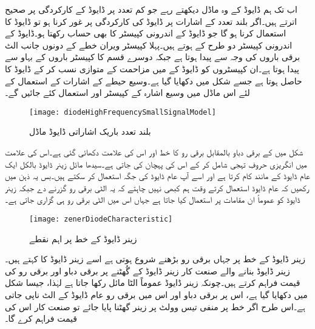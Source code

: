 	اب تک ہم ڈایوڈ کے وہ ماڈل دیکھتے رہے جو کم تعدد پر ڈایوڈ کے کارکردگی پر صحیح اترتے ہیں۔اگر بلند تعدد کے اشارات پر ڈایوڈ کی کارکردگی پر غور کرنا ہو تو ڈایوڈ کا  استعمال کرنا ہو گا جو ڈایوڈ کے اندرونی کپیسٹر کا بھی حساب رکھتا ہو۔ڈایوڈ کے اندرونی کپیسٹر دو طرح کے ہوتے ہیں۔پہلا کپیسٹر  ویران خطے کے دونوں جانب الٹ برقی باروں کی وجہ سے پیدا ہوتا ہے جبکہ دوسرے قسم کا کپیسٹر   باروں کے بہاو سے پیدا ہوتا ہے۔ان کپیسٹروں کو ڈایوڈ کے  میں مزاحمت  کے متوازی نسب کر کے ڈایوڈ کا 
  حاصل ہوتا ہے جسے شکل  میں دکھایا گیا ہے۔وسیع حیطے کے اشارات کے استعمال کے لئے اس ماڈل میں وسیع اشارہ کے کپیسٹر  اور   استعمال کئے جائیں گے۔
\begin{figure}
\centering
\texttt{[image: diodeHighFrequencySmallSignalModel]}
\caption{بلند تعدد باریک اشاراتی ڈایوڈ ماڈل}
\label{شکل_بلند_تعدد_ڈایوڈ_باریک_اشاراتی_ماڈل}
\end{figure}
شکل   میں  کے برقی دباو بالمقابل برقی رو  کا خط اور اس کی علامت دکھائی گئی ہے۔اس کی علامت میں انگریزی حروفِ تہجی   شامل کر کے اس کی پہچان کی جاتی ہے۔سیدھا مائل زینر ڈایوڈ بالکل ایک عام ڈایوڈ کے مانند کام کرتا ہے اور اسے آپ عام ڈایوڈ کی جگہ استعمال کر سکتے ہیں۔بس یہ ذہن میں رکھیں کہ عام ڈایوڈ استعمال کرتے وقت ہم کبھی نہیں چاہتے کہ یہ الٹی برقی رو گزرنے دے جبکہ زینر ڈایوڈ کو عموماً ان مقامات پر استعمال کیا جاتا ہے جہاں اس میں الٹی برقی رو ہی گزاری جاتی ہے۔
\begin{figure}
\centering
\texttt{[image: zenerDiodeCharacteristic]}
\caption{زینر ڈایوڈ کے خط پر اہم نقطے}
\label{شکل_زینر_ڈایوڈ_کا_خط}
\end{figure}
زینر ڈایوڈ کے خط پر جہاں برقی رو بڑھنے شروع ہوتی ہے اسے زینر ڈایوڈ کا    کہتے ہیں۔ زینر ڈایوڈ  بنانے والے صنعت کار زینر ڈایوڈ کے گُھٹنے پر برقی دباو  اور برقی رو  کی قیمت فراہم کرتے ہیں۔چونکہ زینر ڈایوڈ عموماً الٹا مائل رکھا جاتا ہے لہٰذا، جیسا شکل   میں دکھایا گیا ہے، اس پر برقی دباو اور اس میں برقی رو عام ڈایوڈ کے الٹ ناپی جاتی ہے۔اس طرح اگر خط پر منفی تیس وولٹ  پر زینر گھٹنا پایا جائے تو صنعت کار اس کی قیمت  فراہم کرے گا۔

